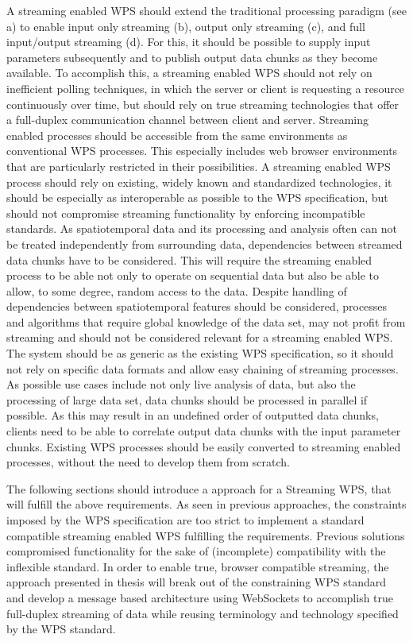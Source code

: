 	A streaming enabled \ac{WPS} should extend the traditional processing paradigm (see a) to enable input only streaming (b), output only streaming (c), and full input/output streaming (d). For this, it should be possible to supply input parameters subsequently and to publish output data chunks as they become available. To accomplish this, a streaming enabled \ac{WPS} should not rely on inefficient polling techniques, in which the server or client is requesting a resource continuously over time, but should rely on true streaming technologies that offer a full-duplex communication channel between client and server. Streaming enabled processes should be accessible from the same environments as conventional \ac{WPS} processes. This especially includes web browser environments that are particularly restricted in their possibilities. A streaming enabled \ac{WPS} process should rely on existing, widely known and standardized technologies, it should be especially as interoperable as possible to the \ac{WPS} specification, but should not compromise streaming functionality by enforcing incompatible standards. As spatiotemporal data and its processing and analysis often can not be treated independently from surrounding data, dependencies between streamed data chunks have to be considered. This will require the streaming enabled process to be able not only to operate on sequential data but also be able to allow, to some degree, random access to the data. Despite handling of dependencies between spatiotemporal features should be considered, processes and algorithms that require global knowledge of the data set, may not profit from streaming and should not be considered relevant for a streaming enabled \ac{WPS}. The system should be as generic as the existing \ac{WPS} specification, so it should not rely on specific data formats and allow easy chaining of streaming processes. As possible use cases include not only live analysis of data, but also the processing of large data set, data chunks should be processed in parallel if possible. As this may result in an undefined order of outputted data chunks, clients need to be able to correlate output data chunks with the input parameter chunks. Existing \ac{WPS} processes should be easily converted to streaming enabled processes, without the need to develop them from scratch.

	The following sections should introduce a approach for a Streaming \ac{WPS}, that will fulfill the above requirements. As seen in previous approaches, the constraints imposed by the \ac{WPS} specification are too strict to implement a standard compatible streaming enabled WPS fulfilling the requirements. Previous solutions compromised functionality for the sake of (incomplete) compatibility with the inflexible standard. In order to enable true, browser compatible streaming, the approach presented in thesis will break out of the constraining \ac{WPS} standard and develop a message based architecture using WebSockets to accomplish true full-duplex streaming of data while reusing terminology and technology specified by the \ac{WPS} standard.

